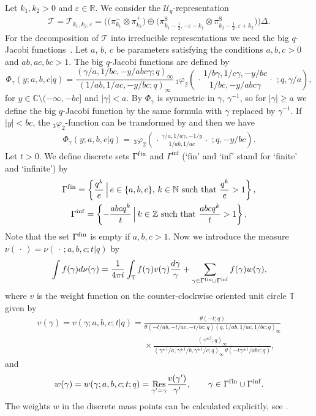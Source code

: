 \documentclass[pdftex]{sigma}
\numberwithin{equation}{section}
\numberwithin{theorem}{section}
\numberwithin{proposition}{section}
\numberwithin{lemma}{section}
\numberwithin{corollary}{section}
\numberwithin{definition}{section}
\numberwithin{example}{section}
\numberwithin{remark}{section}
\numberwithin{note}{section}
\newcommand{\N}{\mathbb N}
\newcommand{\C}{\mathbb C}
\newcommand{\Z}{\mathbb Z}
\newcommand{\T}{\mathbb T}
\newcommand{\eps}{\varepsilon}
\newcommand{\rphis}[5]{\,_{#1}\varphi_{#2} \left( \genfrac{.}{.}{0pt}{}{#3}{#4}
\ ;#5 \right)}
\newcommand{\U}{\mathcal U}
\newcommand{\Res}[1]{\underset{#1}{\mathrm{Res}}}
\begin{document}
Let $k_1,k_2>0$ and $\eps \in \mathbb R$. We consider the $\U_q$-representation
\begin{gather} \label{eq:defT1}
\mathcal T = \mathcal T_{k_1,k_2,\eps}= \Big(\big( \pi_{k_1}^- \otimes \pi_{k_2}^+\big) \oplus \big(\pi^{\mathrm S}_{k_1-\frac12,-\eps-k_1}  \otimes \pi_{k_2-\frac12,\eps+k_2}^{\mathrm S}\big)\Big)  \Delta.
\end{gather}
For the decomposition of $\mathcal T$ into irreducible representations we need the big $q$-Jacobi functions~\cite{KS03}. Let $a$, $b$, $c$ be parameters satisfying the conditions $a,b,c>0$ and $ab,ac,bc>1$. The big $q$-Jacobi functions are def\/ined by
\[
\Phi_\gamma(y;a,b,c|q)= \frac{ (\gamma/a, 1/bc, -y/abc\gamma;q)_\infty} { (1/ab, 1/ac, -y/bc;q)_\infty} \rphis{3}{2}{ 1/b\gamma, 1/c\gamma, -y/bc}{1/bc, -y/abc\gamma}{q, \gamma/a},
\]
for $y \in \C\setminus(-\infty, -bc]$ and $|\gamma|< a$. By \cite[(III.9)]{GRa04} $\Phi_\gamma$ is symmetric in $\gamma$, $\gamma^{-1}$, so for $|\gamma|\geq a$ we def\/ine the big $q$-Jacobi function by the same formula with $\gamma$ replaced by $\gamma^{-1}$. If $|y|<bc$, the $_3\varphi_2$-function can be transformed by \cite[(III.10)]{GRa04} and then we have
\begin{gather} \label{eq:3phi2}
\Phi_\gamma(y;a,b,c|q)= \rphis{3}{2}{\gamma/a, 1/a\gamma, -1/y}{1/ab, 1/ac}{q,-y/bc}.
\end{gather}
Let $t>0$. We def\/ine discrete sets $\Gamma^{\mathrm{f\/in}}$ and $\Gamma^{\mathrm{inf}}$ (`f\/in' and `inf' stand for `f\/inite' and `inf\/inite') by
\begin{gather*}
\Gamma^{\mathrm{f\/in}}=  \left\{ \frac{q^k}{e}\, \Big| \, e \in \{a,b,c\},\, k \in \N \text{ such that } \frac{q^k}{e}>1 \right\},\\
\Gamma^{\mathrm{inf}} = \left\{ -\frac{ abcq^k }{t}\, \Big| \, k \in \Z \text{ such that } \frac{abcq^k}{t}>1 \right\},
\end{gather*}
Note that the set $\Gamma^{\mathrm{f\/in}}$ is empty if $a,b,c>1$.
Now we introduce the measure $\nu(\,\cdot\,)=\nu(\,\cdot\,;a,b,c;t|q)$ by
\[
\int f(\gamma) d\nu(\gamma) = \frac1{4\pi i}\int_\T f(\gamma) v(\gamma) \frac{ d\gamma}{\gamma} + \sum_{\gamma \in \Gamma^{\mathrm{f\/in}} \cup \Gamma^{\mathrm{inf}}} f(\gamma)w(\gamma) ,
\]
where $v$ is the weight function on the counter-clockwise oriented unit circle $\T$ given by
\begin{gather*}
v(\gamma)=v(\gamma;a,b,c;t|q) =  \frac{ \theta(-t;q) }{\theta(-t/ab, -t/ac, -t/bc;q) (q,1/ab,1/ac,1/bc;q)_\infty}\nonumber\\
\phantom{v(\gamma)=v(\gamma;a,b,c;t|q) =}{}  \times \frac{ (\gamma^{\pm 2};q)_\infty }{ (\gamma^{\pm 1}/a, \gamma^{\pm 1}/b, \gamma^{\pm 1}/c;q)_\infty\, \theta(-t\gamma^{\pm 1}/abc;q)},%
\end{gather*}
and{\samepage
\[
w(\gamma)=w(\gamma;a,b,c;t;q) = \Res{\gamma'= \gamma} \frac{ v(\gamma') }{\gamma'}, \qquad \gamma \in \Gamma^{\mathrm{f\/in}} \cup \Gamma^{\mathrm{inf}}.
\]
The weights $w$ in the discrete mass points can be calculated explicitly, see \cite[Section~8]{KS03}.}
\end{document}
